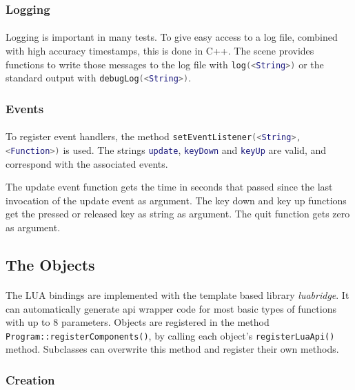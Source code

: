 \subsubsection{Logging}
\paragraph{}
Logging is important in many tests. To give easy access to a log file, combined with high accuracy timestamps, this is done in C++.
The scene provides functions to write those messages to the log file with \lstinline[language=lua]{log(<String>)} or the standard output with \lstinline[language=lua]{debugLog(<String>)}.

\subsubsection{Events}
\paragraph{}
To register event handlers, the method \lstinline[language=lua]{setEventListener(<String>, <Function>)} is used.
The strings \lstinline[language=lua]{update}, \lstinline[language=lua]{keyDown} and \lstinline[language=lua]{keyUp} are valid, and correspond with the associated events.

The update event function gets the time in seconds that passed since the last invocation of the update event as argument.
The key down and key up functions get the pressed or released key as string as argument.
The quit function gets zero as argument.

\subsection{The Objects}
\paragraph{}
The LUA bindings are implemented with the template based library \textit{luabridge}\cite{lb}.
It can automatically generate api wrapper code for most basic types of functions with up to 8 parameters.
Objects are registered in the method \lstinline{Program::registerComponents()},
by calling each object's \lstinline{registerLuaApi()} method.
Subclasses can overwrite this method and register their own methods.

\subsubsection{Creation}
